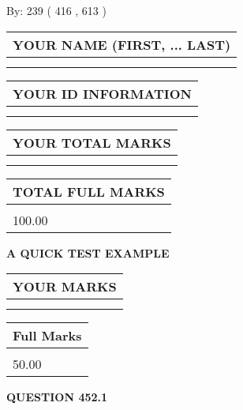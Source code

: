 \documentclass[12pt]{article}
\begin{document}
   
\hspace{1.0in} By: 
 239 ( 416 ,  613 )
   
   
   
   
\newpage 
\setcounter{page}{ 
   452001 } 
   
   
   
   
\noindent\begin{tabular}{|l|}
\hline
YOUR NAME (FIRST, ... LAST)  \\
\hline
 \\ 
 \\ 
\hline
\end{tabular}
\hspace{0.05in} \begin{tabular}{|l|}
\hline
 YOUR   ID   INFORMATION  \\
\hline
 \\ 
 \\ 
\hline
\end{tabular}
   
   
\vspace{0.2in}\noindent\begin{tabular}{|l|}
\hline
YOUR TOTAL MARKS  \\
\hline
 \\ 
 \\ 
\hline
\end{tabular}
\hspace{0.05in} \begin{tabular}{|l|}
\hline
TOTAL FULL MARKS  \\
\hline
 \\ 
100.00 \\
\hline
\end{tabular}
   
   
 \vspace{0.2in}
{\LARGE {\textbf{ A QUICK TEST EXAMPLE}}}
   
   
  
\vspace{0.2in}
  
\noindent\begin{tabular}{|l|}
\hline
 YOUR MARKS  \\
\hline
 \\ 
 \\ 
\hline
\end{tabular}
\hspace{0.05in} \begin{tabular}{|l|}
\hline
 Full Marks  \\
\hline
 \\ 
50.00 \\
\hline
\end{tabular}
{\textbf{\Large{QUESTION
452.1 
}}}
  
\end{document}
